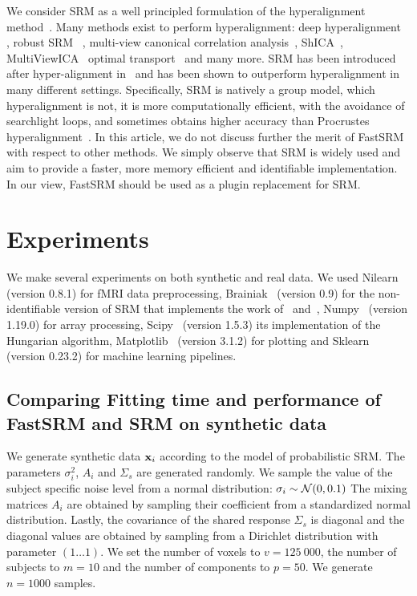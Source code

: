 \documentclass{article}
\newcommand{\bt}[1]{\todo[color=orange, inline=True]{BT: #1}}
\begin{document}
We consider SRM as a well principled formulation of the hyperalignment
method~\cite{haxby2011common}.
%
Many methods exist to perform hyperalignment: deep
hyperalignment~\cite{yousefnezhad2017deep} , robust
SRM~\cite{turek2018capturing} , multi-view canonical correlation
analysis~\cite{li2009joint}, ShICA~\cite{richard2021model},
MultiViewICA~\cite{richard2020modeling} optimal
transport~\cite{bazeille2019local} and many more.
%
SRM has been introduced after hyper-alignment in~\cite{chen2015reduced} and has been shown to outperform hyperalignment in many different settings. Specifically, SRM is natively a group model, which hyperalignment is not, it is more computationally efficient, with the avoidance of searchlight loops, and sometimes obtains higher accuracy than Procrustes hyperalignment~\cite{bazeille2021empirical}. In this article, we do not discuss further the merit of FastSRM with respect to other methods. We simply observe that SRM is widely used and aim to provide a faster, more memory efficient and identifiable implementation.  In our view, FastSRM should be used as a plugin replacement for SRM.

\section{Experiments}
We make several experiments on both synthetic and real data.
%
We used Nilearn~\cite{abraham2014machine} (version 0.8.1) for fMRI data preprocessing,
Brainiak~\cite{kumar2020brainiak2} (version 0.9) for the non-identifiable version of SRM that
implements the work of~\cite{chen2015reduced} and~\cite{anderson2016enabling},
Numpy~\cite{harris2020array} (version 1.19.0) for
array processing, Scipy~\cite{2020SciPy-NMeth} (version 1.5.3) its implementation of the
Hungarian algorithm, Matplotlib~\cite{hunter2007matplotlib} (version 3.1.2) for plotting and
Sklearn~\cite{pedregosa2011scikit} (version 0.23.2) for machine learning pipelines.

\subsection{Comparing Fitting time and performance of FastSRM and
  SRM on synthetic data}
We generate synthetic data $\mathbf{x}_i$ according to the model of probabilistic SRM.
%
The parameters $\sigma_i^2$, $A_i$ and $\Sigma_s$ are generated randomly.
%
We sample the value of the subject specific noise level from a normal
distribution: $\sigma_i \sim \mathcal{N}(0, 0.1)$
%
The mixing matrices $A_i$
are obtained by sampling their coefficient from a standardized normal
distribution.
%
Lastly, the covariance of the shared response $\Sigma_s$ is diagonal and the
diagonal values are obtained by sampling from a Dirichlet distribution with
parameter $(1 \dots 1)$.
%
We set the number of voxels to $v=125~000$, the number of subjects to $m=10$ and
the number of components to $p=50$.
%
We generate $n=1000$ samples.
%
\end{document}
